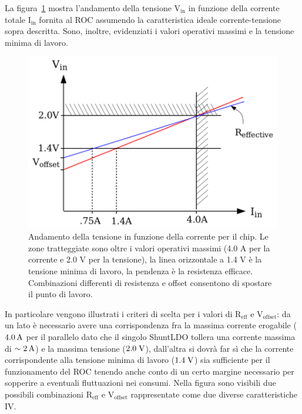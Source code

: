 La figura~\ref{VVC} mostra l'andamento della tensione $\mathrm{V_{in}}$ in funzione della corrente totale $\mathrm{I_{in}}$ fornita al ROC assumendo la caratteristica ideale corrente-tensione sopra descritta. Sono, inoltre, evidenziati i valori operativi massimi e la tensione minima di lavoro.
\begin{figure}[!htbp]
\centering
\includegraphics[scale=.3]{Immagini/VoltageVsCurrent}
\caption{Andamento della tensione in funzione della corrente per il chip. Le zone tratteggiate sono oltre i valori operativi massimi (4.0 A per la corrente e 2.0 V per la tensione), la linea orizzontale a 1.4 V è la tensione minima di lavoro, la pendenza è la resistenza efficace. Combinazioni differenti di resistenza e offset consentono di spostare il punto di lavoro.}
\label{VVC}
\end{figure}
In particolare vengono illustrati i criteri di scelta per i valori di $\mathrm{R_{eff}}$ e $\mathrm{V_{offset}}$: da un lato \`e necessario avere una corrispondenza fra la massima corrente erogabile ($4.0\rm \, A$ per il parallelo dato che il singolo ShuntLDO tollera una corrente massima di $\sim2\rm \, A$) e la massima tensione ($2.0\rm \; V$), dall'altra si dovrà far s\`i che la corrente corrispondente alla tensione minima di lavoro ($1.4\rm \; V$) sia sufficiente per il funzionamento del ROC tenendo anche conto di un certo margine necessario per sopperire a eventuali fluttuazioni nei consumi. Nella figura sono visibili due possibili combinazioni $\mathrm{R_{eff}}$ e $\mathrm{V_{offset}}$ rappresentate come due diverse caratteristiche IV.

